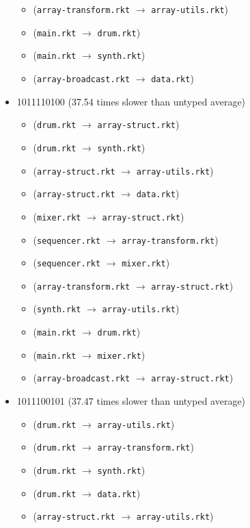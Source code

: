 \documentclass{article}
\newcommand{\mono}[1]{\texttt{#1}}
\begin{document}
\begin{itemize}
\begin{itemize}
  \item (\mono{array-transform.rkt} $\rightarrow$ \mono{array-utils.rkt})
  \item (\mono{main.rkt} $\rightarrow$ \mono{drum.rkt})
  \item (\mono{main.rkt} $\rightarrow$ \mono{synth.rkt})
  \item (\mono{array-broadcast.rkt} $\rightarrow$ \mono{data.rkt})
  \end{itemize}
\item 1011110100 (37.54 times slower than untyped average)
  \begin{itemize}
  \item (\mono{drum.rkt} $\rightarrow$ \mono{array-struct.rkt})
  \item (\mono{drum.rkt} $\rightarrow$ \mono{synth.rkt})
  \item (\mono{array-struct.rkt} $\rightarrow$ \mono{array-utils.rkt})
  \item (\mono{array-struct.rkt} $\rightarrow$ \mono{data.rkt})
  \item (\mono{mixer.rkt} $\rightarrow$ \mono{array-struct.rkt})
  \item (\mono{sequencer.rkt} $\rightarrow$ \mono{array-transform.rkt})
  \item (\mono{sequencer.rkt} $\rightarrow$ \mono{mixer.rkt})
  \item (\mono{array-transform.rkt} $\rightarrow$ \mono{array-struct.rkt})
  \item (\mono{synth.rkt} $\rightarrow$ \mono{array-utils.rkt})
  \item (\mono{main.rkt} $\rightarrow$ \mono{drum.rkt})
  \item (\mono{main.rkt} $\rightarrow$ \mono{mixer.rkt})
  \item (\mono{array-broadcast.rkt} $\rightarrow$ \mono{array-struct.rkt})
  \end{itemize}
\item 1011100101 (37.47 times slower than untyped average)
  \begin{itemize}
  \item (\mono{drum.rkt} $\rightarrow$ \mono{array-utils.rkt})
  \item (\mono{drum.rkt} $\rightarrow$ \mono{array-transform.rkt})
  \item (\mono{drum.rkt} $\rightarrow$ \mono{synth.rkt})
  \item (\mono{drum.rkt} $\rightarrow$ \mono{data.rkt})
  \item (\mono{array-struct.rkt} $\rightarrow$ \mono{array-utils.rkt})

\end{itemize}
\end{itemize}
\end{document}
